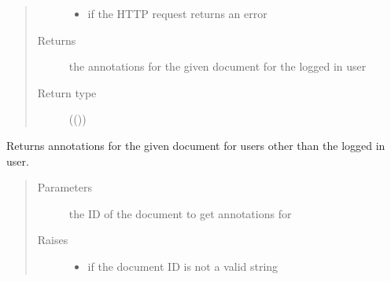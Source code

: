 \documentclass[letterpaper,10pt,english]{sphinxmanual}
\begin{document}
\begin{fulllineitems}
\begin{fulllineitems}
\begin{quote}
\begin{description}
\begin{itemize}
\item {} 
\sphinxAtStartPar
{\hyperref[\detokenize{autoapi/pine/client/exceptions/index:pine.client.exceptions.PineClientHttpException}]{}} \textendash{} if the HTTP request returns an error

\end{itemize}

\item[{Returns}] \leavevmode
\sphinxAtStartPar
the annotations for the given document for the logged in user

\item[{Return type}] \leavevmode
\sphinxAtStartPar
{}(())

\end{description}\end{quote}

\end{fulllineitems}


\begin{fulllineitems}
\label{\detokenize{autoapi/pine/client/client/index:pine.client.client.PineClient.get_others_document_annotations}}
\sphinxAtStartPar
Returns annotations for the given document for users other than the logged in user.
\begin{quote}\begin{description}
\item[{Parameters}] \leavevmode
\sphinxAtStartPar
{} \textendash{} the ID of the document to get annotations for

\item[{Raises}] \leavevmode\begin{itemize}
\item {} 
\sphinxAtStartPar
{\hyperref[\detokenize{autoapi/pine/client/exceptions/index:pine.client.exceptions.PineClientValueException}]{}} \textendash{} if the document ID is not a valid string


\end{itemize}
\end{description}
\end{quote}
\end{fulllineitems}
\end{fulllineitems}
\end{document}
